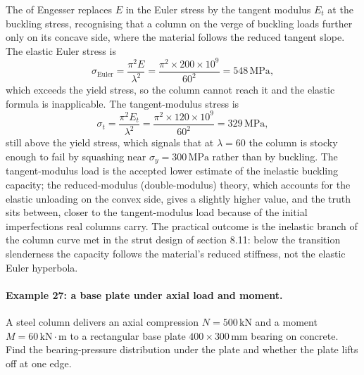 The  of Engesser replaces $E$ in the
Euler stress by the tangent modulus $E_t$ at the buckling stress,
recognising that a column on the verge of buckling loads further only on
its concave side, where the material follows the reduced tangent slope.
The elastic Euler stress is
\[
\sigma_{\text{Euler}} = \frac{\pi^2 E}{\lambda^2}
= \frac{\pi^2 \times 200 \times 10^9}{60^2}
= 548\,\text{MPa},
\]
which exceeds the yield stress, so the column cannot reach it and the
elastic formula is inapplicable. The tangent-modulus stress is
\[
\sigma_t = \frac{\pi^2 E_t}{\lambda^2}
= \frac{\pi^2 \times 120 \times 10^9}{60^2}
= 329\,\text{MPa},
\]
still above the yield stress, which signals that at $\lambda = 60$ the
column is stocky enough to fail by squashing near $\sigma_y
= 300\,\text{MPa}$ rather than by buckling. The tangent-modulus load is
the accepted lower estimate of the inelastic buckling capacity; the
reduced-modulus (double-modulus) theory, which accounts for the elastic
unloading on the convex side, gives a slightly higher value, and the
truth sits between, closer to the tangent-modulus load because of the
initial imperfections real columns carry. The practical outcome is the
inelastic branch of the column curve met in the strut design of section
8.11: below the transition slenderness the capacity follows the
material's reduced stiffness, not the elastic Euler hyperbola.

\paragraph{Example 27: a base plate under axial load and moment.} A
steel column delivers an axial compression $N = 500\,\text{kN}$ and a
moment $M = 60\,\text{kN}\cdot\text{m}$ to a rectangular base plate
$400 \times 300\,\si{\milli\meter}$ bearing on concrete. Find the
bearing-pressure distribution under the plate and whether the plate
lifts off at one edge.

